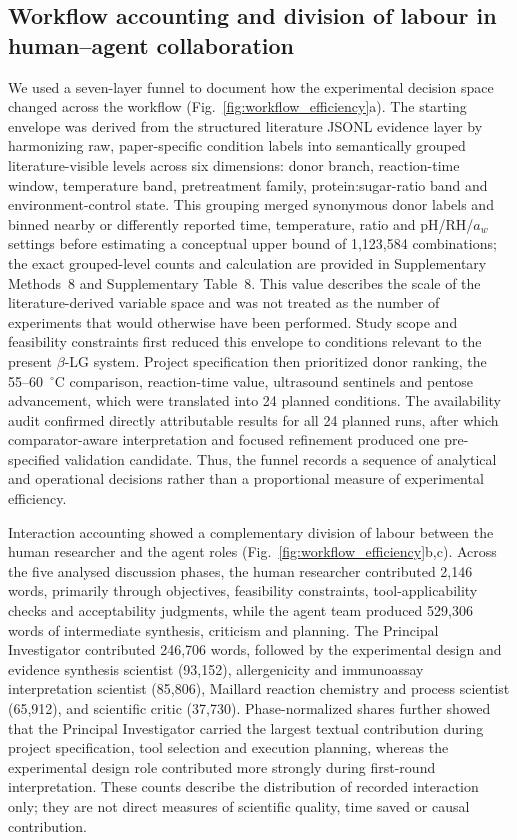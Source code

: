 \subsection{Workflow accounting and division of labour in human--agent collaboration}

We used a seven-layer funnel to document how the experimental decision space changed across the workflow (Fig.~\ref{fig:workflow_efficiency}a). The starting envelope was derived from the structured literature JSONL evidence layer by harmonizing raw, paper-specific condition labels into semantically grouped literature-visible levels across six dimensions: donor branch, reaction-time window, temperature band, pretreatment family, protein:sugar-ratio band and environment-control state. This grouping merged synonymous donor labels and binned nearby or differently reported time, temperature, ratio and pH/RH/$a_w$ settings before estimating a conceptual upper bound of 1,123,584 combinations; the exact grouped-level counts and calculation are provided in Supplementary Methods~8 and Supplementary Table~8. This value describes the scale of the literature-derived variable space and was not treated as the number of experiments that would otherwise have been performed. Study scope and feasibility constraints first reduced this envelope to conditions relevant to the present $\beta$-LG system. Project specification then prioritized donor ranking, the 55--60~$^\circ$C comparison, reaction-time value, ultrasound sentinels and pentose advancement, which were translated into 24 planned conditions. The availability audit confirmed directly attributable results for all 24 planned runs, after which comparator-aware interpretation and focused refinement produced one pre-specified validation candidate. Thus, the funnel records a sequence of analytical and operational decisions rather than a proportional measure of experimental efficiency.

Interaction accounting showed a complementary division of labour between the human researcher and the agent roles (Fig.~\ref{fig:workflow_efficiency}b,c). Across the five analysed discussion phases, the human researcher contributed 2,146 words, primarily through objectives, feasibility constraints, tool-applicability checks and acceptability judgments, while the agent team produced 529,306 words of intermediate synthesis, criticism and planning. The Principal Investigator contributed 246,706 words, followed by the experimental design and evidence synthesis scientist (93,152), allergenicity and immunoassay interpretation scientist (85,806), Maillard reaction chemistry and process scientist (65,912), and scientific critic (37,730). Phase-normalized shares further showed that the Principal Investigator carried the largest textual contribution during project specification, tool selection and execution planning, whereas the experimental design role contributed more strongly during first-round interpretation. These counts describe the distribution of recorded interaction only; they are not direct measures of scientific quality, time saved or causal contribution.

